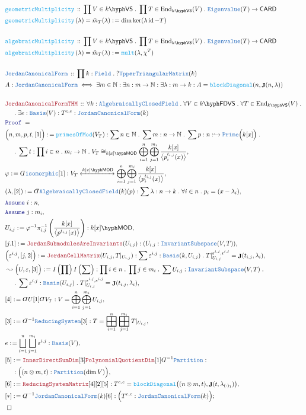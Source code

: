 \documentclass[12pt]{scrartcl}%
\newcommand{\TYPE}[1]{\textcolor{NavyBlue}{\mathtt{#1}}}%
\newcommand{\FUNC}[1]{\textcolor{Cerulean}{\mathtt{#1}}}%
\newcommand{\LOGIC}[1]{\textcolor{Blue}{\mathtt{#1}}}%
\newcommand{\THM}[1]{\textcolor{Maroon}{\mathtt{#1}}}%
\renewcommand{\.}{\; . \;} %
\newcommand{\de}{: \kern 0.1pc =} %
\newcommand{\Act}[1]{\left( #1 \right)} %
\newcommand{\Theorem}[2]{& \THM{#1} \, :: \, #2 \\ & \Proof = \\ } %
\newcommand{\DeclareType}[2]{& \TYPE{#1} \, :: \, #2 \\}%
\newcommand{\DefineType}[3]{& #1 : \TYPE{#2} \iff #3 \\}%
\newcommand{\DeclareFunc}[2]{& \FUNC{#1} \, :: \, #2 \\}%
\newcommand{\DefineNamedFunc}[4]{&  \FUNC{#1}\Act{#2} = #3 \de #4 \\}%
\newcommand{\NewLine}{\\ & \kern 1pc}%
\newcommand{\Page}[1]{ \begin{align*} #1 \end{align*}  }%
\newcommand{ \bd }{ \ByDef }%
\newcommand{\Nat}{\mathbb{N}}%
\DeclareMathOperator*{\id}{id}%
\newcommand{\End}{\mathrm{End}}%
\newcommand{\ToInj}{\hookrightarrow} %
\newcommand{\Say}[3]{& #1 \de #2 : #3, \\} %
\newcommand{\Conclude}[3]{& #1 \de #2 : #3; \\}%
\newcommand{\Derive}[3]{& \leadsto #1 \de #2 : #3, \\} %
\newcommand{\Assume}[2]{& \LOGIC{Assume} \; #1 : #2, \\} %
\newcommand{\QED}{\; \square} %
\newcommand{\EndProof}{& \QED \\} %
\newcommand{\ByDef}{\rotatebox[origin=c]{-180}{$D$}}%
\newcommand{\Proof}{\LOGIC{Proof} \; } %
\newcommand{\ToIso}[1]{\xleftrightarrow{#1}}%
\newcommand{\Basis}{\TYPE{Basis}} %
\newcommand{\UTM}{\TYPE{UpperTriangularMatrix}}
\newcommand{\IS}{\TYPE{InvariantSubspace}}
\newcommand{\JCF}{\TYPE{JordanCanonicalForm}}
\DeclareMathOperator{\JC}{\mathbf{J}}  %
\DeclareMathOperator{\bigboxplus}{\scalerel*{\boxplus}{\sum}} %
\newcommand{\VS}[1]{#1\hyph\mathsf{VS}} %
\newcommand{\FDVS}[1]{#1\hyph\mathsf{FDVS}} %
\newcommand{\LMOD}[1]{#1\hyph\mathsf{MOD}} %
\newcommand{\Field}{\TYPE{Field}}
\newcommand{\ACF}{\TYPE{AlgebraicallyClosedField}}
\begin{document}
\Page{
	\DeclareFunc{geometricMultiplicity}{\prod V \in \VS{k} \. \prod T \in \End_{\VS{k}}(V) \. \TYPE{Eigenvalue}(T) \to \mathsf{CARD}}
	\DefineNamedFunc{geometricMultiplicity}{\lambda}{\bar m_T(\lambda)}{\dim \ker(\lambda \id - T) }
	\\
	\DeclareFunc{algebraicMultiplicity}{\prod V \in \VS{k} \. \prod T \in \End_{\VS{k}}(V) \. \TYPE{Eigenvalue}(T) \to \mathsf{CARD}}
	\DefineNamedFunc{algebraicMultiplicity}{\lambda}{\tilde m_T(\lambda)}{\FUNC{mult}(\lambda, \chi^T) }
	\\
	\DeclareType{\JCF}{ \prod k : \Field \. ?\UTM(k)}
	\DefineType{A}{\JCF}{\exists m \in \Nat : \exists n : m \to \Nat : \exists \lambda : m \to k : A = \FUNC{blockDiagonal}(n,\JC(n,\lambda))}
	\\
	\Theorem{JordanCanonicalFormTHM}{ 
		\forall k : \ACF \.  
		\forall V \in \FDVS{k} \. 
		\forall T \in \End_{\VS{k}}(V) \. \NewLine \.  
		\exists e : \Basis(V) : T^{e,e} : \JCF(k)
	} 
	\Say{\Big( n,m,p,t,[1] \Big)}{\FUNC{primesOfMod}(V_T)}
	{
		\sum n \in \Nat \. 
		\sum m : n \to \Nat \. 
		\sum p : n : \ToInj \TYPE{Prime}\Big(k[x]\Big) \. \NewLine \. 
		\sum t : \prod i \in n \. m_i \to \Nat \. 
		V_T \cong_{\LMOD{k[x]}} \bigoplus^n_{i=1}\bigoplus^{m_i}_{j=1} \frac{k[x]}{\big\langle p^{t_{i,j}}_{i}(x) \big\rangle} 
	}
	\Say{\varphi}{\bd \TYPE{isomorphic}[1]}{ V_T \ToIso{\LMOD{k[x]}} \bigoplus^n_{i=1}\bigoplus^{m_i}_{j=1} \frac{k[x]}{\big\langle p^{t_{i,j}}_{i}(x) \big\rangle}}
	\Say{(\lambda,[2])}{\bd \ACF(k)(p)}{\sum \lambda : n \to k \.  \forall i \in n \. p_i = (x - \lambda_i)}
	\Assume{i}{n}
	\Assume{j}{m_i}
	\Say{U_{i,j}}{\varphi^{-1}\pi_{i,j}^{-1}\left(\frac{k[x]}{\big\langle p^{t_{i,j}}(x) \big\rangle}\right)}{\LMOD{k[x]}}
	\Say{ [j.1]}{\THM{JordanSubmodulesAreInvariants}(U_{i,j})}{(U_{i,j} : \IS(V,T))}
	\Say{\Big(\varepsilon^{i,j},[j,2]\Big)}{ \THM{JordanCellMatrix}(U_{i,j},T|_{U_{i,j}}) }{ \sum \varepsilon^{i,j} : \Basis(k,U_{i,j}) \. 
		T|_{U_{i,j}}^{\varepsilon^{i,j},\varepsilon^{i,j}} = \JC(t_{i,j},\lambda_i)}
	\Derive{\Big( U,\varepsilon,  [3] \Big)}{ I\left( \prod \right)I\left( \sum  \right) }
	{
		\prod i \in n \. 
		\prod j \in m_i \. 
		\sum U_{i,j} : \IS(V,T) \. \NewLine \.  
		\sum \varepsilon^{i,j} : \TYPE{Basis}(U_{i,j}) \. 
		T|_{U_{i,j}}^{\varepsilon^{i,j},\varepsilon^{i,j}}  = \JC(t_{i,j},\lambda_i)
	}
	\Say{[4]}{\bd U [1]\bd V_T}{  V = \bigoplus_{i=1}^n\bigoplus^{m_i}_{j=1} U_{i,j}   }
	\Say{[3]}{\bd^{-1}\TYPE{ReducingSystem}[3]}{T = \bigboxplus^n_{i=1}\bigboxplus^{m_i}_{j=1} T|_{U_{i,j}}}
	\Say{e}{\bigsqcup_{i=1}^n\bigsqcup^{m_i}_{j=1}\varepsilon^{i,j}}{\TYPE{Basis}(V)}
	\Say{[5]}{\THM{InnerDirectSumDim}[3]\THM{PolynomialQuotientDim}[1]\bd^{-1}\TYPE{Partition}}{ \NewLine :\Big( (n \otimes m, t) : \TYPE{Partition}(\dim V)\Big)}
	\Say{[6]}{\THM{ReducingSystemMatrix}[4][2][5]}{ T^{e,e} = \FUNC{blockDiagonal}\big((n \otimes m, t),\JC(t,\lambda_{(\cdot)_1})\big)   }
	\Conclude{[*]}{\bd^{-1}\JCF(k)[6] }{\Big( T^{e,e} : \JCF(k)\Big)}
	\EndProof
}
\end{document}
